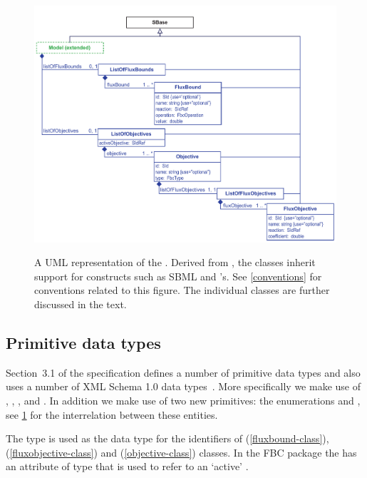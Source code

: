 \begin{figure}[h!]
  \centering
  \includegraphics[width=\textwidth]{images/fbc_uml.pdf}\\
  \caption{A UML representation of the \FBCPackage. Derived from \SBase, the \FBC classes inherit support for constructs such as SBML \Notes and \Annotation's. See \ref{conventions} for conventions related to this figure. The individual classes are further discussed in the text.}
  \label{fig:fbc_uml}
\end{figure}

\subsection{Primitive data types}
\label{primtypes}

Section~3.1 of the \sbmlthreecore specification defines a number of primitive
data types and also uses a number of XML Schema 1.0 data types~\citep{biron:2000}.
More specifically we make use of , ,
,  and . In addition we make use of
two new primitives: the enumerations  and ,
see \ref{fig:fbc_uml} for the interrelation between these entities.

The  type is used as the data type for the identifiers of \FluxBound
(\ref{fluxbound-class}), \FluxObjective (\ref{fluxobjective-class}) and \Objective
(\ref{objective-class}) classes. In the FBC package the \ListOfObjectives has an
attribute of type  that is used to refer to an `active' \Objective.

